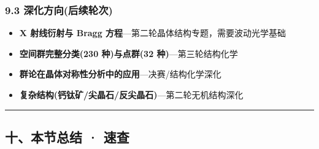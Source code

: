 \documentclass[a4paper,11pt]{ctexart}
\providecommand{\tightlist}{\setlength{\itemsep}{0pt}\setlength{\parskip}{0pt}}
\newcommand{\箭}{\ensuremath{\rightarrow}}
\newcommand{\左箭}{\ensuremath{\leftarrow}}
\newcommand{\上箭}{\ensuremath{\uparrow}}
\newcommand{\下箭}{\ensuremath{\downarrow}}
\newcommand{\衡}{\ensuremath{\rightleftharpoons}}
\newcommand{\双箭}{\ensuremath{\leftrightarrow}}
\newcommand{\约等于}{\ensuremath{\approx}}
\newcommand{\小于等于}{\ensuremath{\leq}}
\newcommand{\大于等于}{\ensuremath{\geq}}
\newcommand{\不等于}{\ensuremath{\neq}}
\newcommand{\西格马}{\ensuremath{\sigma}}
\newcommand{\派}{\ensuremath{\pi}}
\begin{document}
\subsubsection{9.3 深化方向(后续轮次)}\label{ux6df1ux5316ux65b9ux5411ux540eux7eedux8f6eux6b21}

\begin{itemize}
\tightlist
\item
  \textbf{X 射线衍射与 Bragg 方程}---第二轮晶体结构专题，需要波动光学基础
\item
  \textbf{空间群完整分类(230 种)与点群(32 种)}---第三轮结构化学
\item
  \textbf{群论在晶体对称性分析中的应用}---决赛/结构化学深化
\item
  \textbf{复杂结构(钙钛矿/尖晶石/反尖晶石)}---第二轮无机结构深化
\end{itemize}

\begin{center}\rule{0.5\linewidth}{0.5pt}\end{center}

\subsection{十、本节总结 · 速查}\label{ux5341ux672cux8282ux603bux7ed3-ux901fux67e5}
\end{document}
